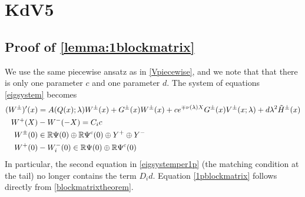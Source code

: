 \documentclass[thesis.tex]{subfiles}
\begin{document}
\iffulldocument\else
	\chapter{KdV5}
\fi

\section{Proof of \cref{lemma:1blockmatrix} }

We use the same piecewise ansatz as in \cref{Vpiecewise}, and we note that that there is only one parameter $c$ and one parameter $d$. The system of equations \cref{eigsystem} becomes
\begin{equation}\label{eigsystemper1p}
\begin{aligned}
(W^\pm)'(x) &= A(Q(x); \lambda) W^\pm(x) + G^\pm(x) W^\pm(x) + c e^{\mp\nu(\lambda)X} G^\pm(x)V^\pm(x; \lambda) + d \lambda^2 \tilde{H}^\pm(x) \\
W^+(X) &- W^-(-X) = C_i c \\
W^\pm(0) &\in \mathbb{R} \Psi(0) \oplus \mathbb{R} \Psi^c(0) \oplus Y^+ \oplus Y^- \\
W^+(0) &- W_i^-(0) \in \mathbb{R} \Psi(0) \oplus \mathbb{R} \Psi^c(0) 
\end{aligned}
\end{equation}
In particular, the second equation in \cref{eigsystemper1p} (the matching condition at the tail) no longer contains the term $D_i d$. Equation \cref{1pblockmatrix} follows directly from \cref{blockmatrixtheorem}.
\end{document}
